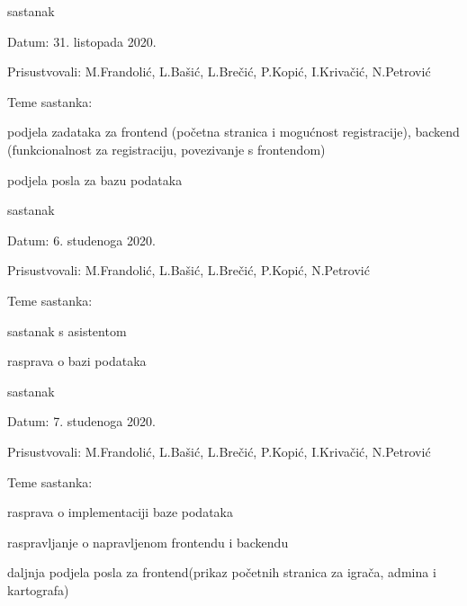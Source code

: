 \begin{packed_enum}
			\item sastanak
			\item[] \begin{packed_item}
				\item Datum: 31. listopada 2020.
				\item Prisustvovali: M.Frandolić, L.Bašić, L.Brečić, P.Kopić, I.Krivačić, N.Petrović
				\item Teme sastanka:
				\begin{packed_item}
					\item podjela zadataka za frontend (početna stranica i mogućnost registracije), backend (funkcionalnost za registraciju, povezivanje s frontendom)
					\item podjela posla za bazu podataka
				\end{packed_item}
			\end{packed_item}
		
			\item sastanak
			\item[] \begin{packed_item}
				\item Datum: 6. studenoga 2020.
				\item Prisustvovali: M.Frandolić, L.Bašić, L.Brečić, P.Kopić, N.Petrović
				\item Teme sastanka:
				\begin{packed_item}
					\item sastanak s asistentom 
					\item rasprava o bazi podataka
				\end{packed_item}
			\end{packed_item}
			\newpage
			\item sastanak
			\item[] \begin{packed_item}
				\item Datum: 7. studenoga 2020.
				\item Prisustvovali: M.Frandolić, L.Bašić, L.Brečić, P.Kopić, I.Krivačić, N.Petrović
				\item Teme sastanka:
				\begin{packed_item}
					\item rasprava o implementaciji baze podataka
					\item raspravljanje o napravljenom frontendu i backendu
					\item daljnja podjela posla za frontend(prikaz početnih stranica za igrača, admina i kartografa)
				\end{packed_item}
			\end{packed_item}
			

\end{packed_enum}
